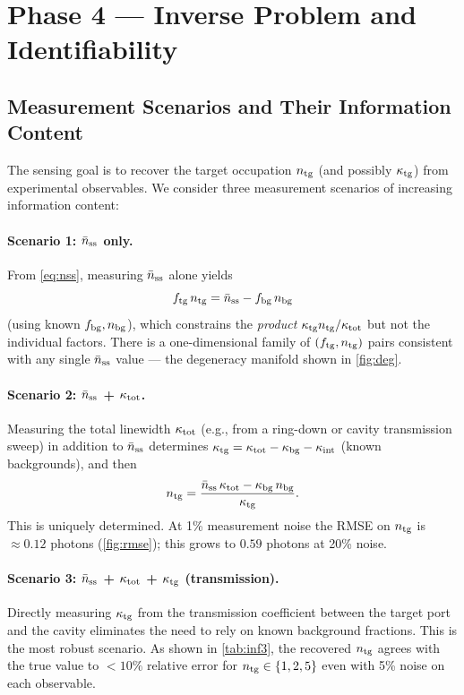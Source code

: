\documentclass[11pt,a4paper]{article}
\newcommand{\nbar}{\bar{n}}
\newcommand{\kappat}{\kappa_{\rm tot}}
\newcommand{\kappatg}{\kappa_{\rm tg}}
\newcommand{\kappabg}{\kappa_{\rm bg}}
\newcommand{\kappaint}{\kappa_{\rm int}}
\newcommand{\ntg}{n_{\rm tg}}
\newcommand{\nbg}{n_{\rm bg}}
\newcommand{\nss}{\nbar_{\rm ss}}
\begin{document}
\section{Phase 4 --- Inverse Problem and Identifiability}
\label{sec:phase4}

\subsection{Measurement Scenarios and Their Information Content}
\label{sec:identifiability}

The sensing goal is to recover the target occupation $\ntg$ (and possibly
$\kappatg$) from experimental observables.  We consider three measurement
scenarios of increasing information content:

\paragraph{Scenario 1: $\nss$ only.}
From \cref{eq:nss}, measuring $\nss$ alone yields
\begin{equation}
  f_{\rm tg}\,\ntg = \nss - f_{\rm bg}\,\nbg
\end{equation}
(using known $f_{\rm bg}, \nbg$), which constrains the
\emph{product} $\kappatg\ntg / \kappat$ but not the individual factors.
There is a one-dimensional family of $(f_{\rm tg}, \ntg)$ pairs consistent
with any single $\nss$ value --- the degeneracy manifold shown in \cref{fig:deg}.

\paragraph{Scenario 2: $\nss$ + $\kappat$.}
Measuring the total linewidth $\kappat$ (e.g., from a ring-down or
cavity transmission sweep) in addition to $\nss$ determines
$\kappatg = \kappat - \kappabg - \kappaint$ (known backgrounds), and then
\begin{equation}
  \ntg = \frac{\nss\,\kappat - \kappabg\,\nbg}{\kappatg}.
  \label{eq:inference2}
\end{equation}
This is uniquely determined.
At 1\% measurement noise the RMSE on $\ntg$ is $\approx 0.12$ photons
(\cref{fig:rmse}); this grows to $0.59$ photons at 20\% noise.

\paragraph{Scenario 3: $\nss$ + $\kappat$ + $\kappatg$ (transmission).}
Directly measuring $\kappatg$ from the transmission coefficient between the
target port and the cavity eliminates the need to rely on known background
fractions.  This is the most robust scenario.  As shown in \cref{tab:inf3},
the recovered $\ntg$ agrees with the true value to $< 10\%$ relative error
for $\ntg \in \{1, 2, 5\}$ even with 5\% noise on each observable.
\end{document}
